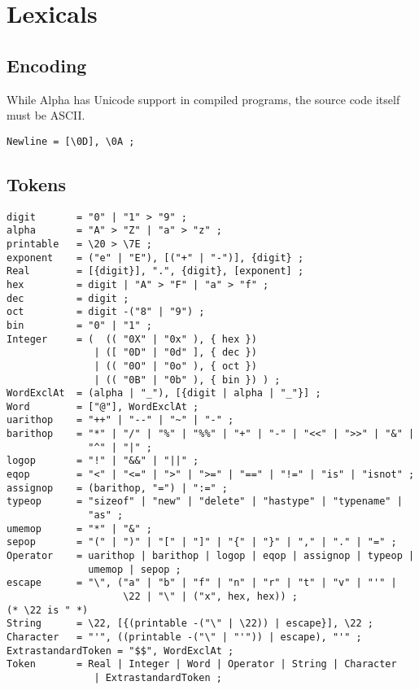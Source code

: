 \documentclass{article}
\begin{document}
\section{Lexicals}
\label{sec:lexicals}

\subsection{Encoding}
\label{sec:encoding}
While Alpha has Unicode support in compiled programs, the source code itself
must be ASCII.
\begin{verbatim}
Newline = [\0D], \0A ;
\end{verbatim}

\subsection{Tokens}
\label{sub:lexicals:tokens}
\begin{verbatim}
digit       = "0" | "1" > "9" ;
alpha       = "A" > "Z" | "a" > "z" ;
printable   = \20 > \7E ;
exponent    = ("e" | "E"), [("+" | "-")], {digit} ;
Real        = [{digit}], ".", {digit}, [exponent] ;
hex         = digit | "A" > "F" | "a" > "f" ;
dec         = digit ;
oct         = digit -("8" | "9") ;
bin         = "0" | "1" ;
Integer     = (  (( "0X" | "0x" ), { hex })
               | ([ "0D" | "0d" ], { dec })
               | (( "0O" | "0o" ), { oct })
               | (( "0B" | "0b" ), { bin }) ) ;
WordExclAt  = (alpha | "_"), [{digit | alpha | "_"}] ;
Word        = ["@"], WordExclAt ;
uarithop    = "++" | "--" | "~" | "-" ;
barithop    = "*" | "/" | "%" | "%%" | "+" | "-" | "<<" | ">>" | "&" |
              "^" | "|" ;
logop       = "!" | "&&" | "||" ;
eqop        = "<" | "<=" | ">" | ">=" | "==" | "!=" | "is" | "isnot" ;
assignop    = (barithop, "=") | ":=" ;
typeop      = "sizeof" | "new" | "delete" | "hastype" | "typename" |
              "as" ;
umemop      = "*" | "&" ;
sepop       = "(" | ")" | "[" | "]" | "{" | "}" | "," | "." | "=" ;
Operator    = uarithop | barithop | logop | eqop | assignop | typeop |
              umemop | sepop ;
escape      = "\", ("a" | "b" | "f" | "n" | "r" | "t" | "v" | "'" |
                    \22 | "\" | ("x", hex, hex)) ;
(* \22 is " *)
String      = \22, [{(printable -("\" | \22)) | escape}], \22 ;
Character   = "'", ((printable -("\" | "'")) | escape), "'" ;
ExtrastandardToken = "$$", WordExclAt ;
Token       = Real | Integer | Word | Operator | String | Character
               | ExtrastandardToken ;
\end{verbatim}
\end{document}

